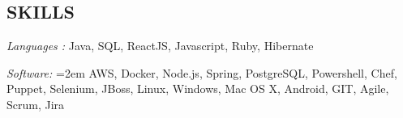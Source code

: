 \documentclass[12pt, line, margin]{res}
\begin{document}

\address{
}

\begin{resume}


\section{SKILLS} {\sl Languages :} Java, SQL, ReactJS, Javascript, Ruby, Hibernate

               {\sl Software:}  
			\hangindent=2em
			AWS, Docker, Node.js, Spring, PostgreSQL, Powershell, \newline 
			Chef, Puppet, Selenium, JBoss, Linux, Windows, Mac OS X, \newline 
                                Android, GIT, Agile, Scrum, Jira
			

\end{resume}
\end{document}
